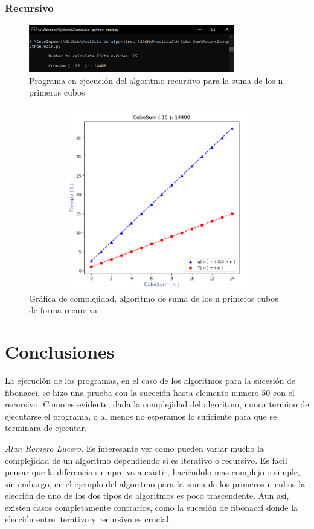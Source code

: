 \documentclass[12pt,twoside]{article}
\begin{document}
\subsubsection{Recursivo}
\begin{figure}[ht]
    \centering
    \includegraphics[width = 9cm]{cubico_recursivo_consola.png}
    \caption{Programa en ejecuci\'on del algoritmo recursivo para la suma de los n primeros cubos}
    \label{fig:n_cubos_rec}
\end{figure}
\begin{figure}[ht]
    \centering
    \includegraphics[width = 13cm,height = 8cm ]{cubico_recursivo_grafica.png}
    \caption{Gr\'afica de complejidad, algoritmo de suma de los n primeros cubos de forma recursiva}
    \label{fig:n_cubos_rec_graf}
\end{figure}

\newpage
\vfill
\clearpage
\section{Conclusiones}
La ejecuci\'on de los programas, en el caso de los algoritmos para la sucesi\'on de fibonacci, se hizo una prueba con la suceci\'on hasta elemento numero 50 con el recursivo. Como es evidente, dada la complejidad del algoritmo, nunca termino de ejecutarse el programa, o al menos no esperamos lo suficiente para que se terminara de ejecutar.

\textit{Alan Romero Lucero}. Es interesante ver como pueden variar mucho la complejidad de un algoritmo dependiendo si es iterativo o recursivo. Es f\'acil pensar que la diferencia siempre va a existir, haci\'endolo mas complejo o simple, sin embargo, en el ejemplo del algoritmo para la suma de los primeros n cubos la elecci\'on de uno de los dos tipos de algoritmos es poco trascendente. Aun as\'i, existen casos completamente contrarios, como la sucesi\'on de fibonacci donde la elecci\'on entre iterativo y recursivo es crucial.
\end{document}
